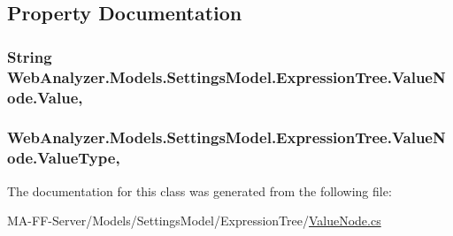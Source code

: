 \subsection{Property Documentation}
\hypertarget{class_web_analyzer_1_1_models_1_1_settings_model_1_1_expression_tree_1_1_value_node_abc4f8ff5dd972ce1c49f135273797926}{}
\subsubsection[{Value}]{\setlength{\rightskip}{0pt plus 5cm}String Web\+Analyzer.\+Models.\+Settings\+Model.\+Expression\+Tree.\+Value\+Node.\+Value\hspace{0.3cm}{\ttfamily [get]}, {\ttfamily [set]}}\label{class_web_analyzer_1_1_models_1_1_settings_model_1_1_expression_tree_1_1_value_node_abc4f8ff5dd972ce1c49f135273797926}
\hypertarget{class_web_analyzer_1_1_models_1_1_settings_model_1_1_expression_tree_1_1_value_node_aa1c55c593ae80ac78221c1397ede5ab2}{}
\subsubsection[{Value\+Type}]{ Web\+Analyzer.\+Models.\+Settings\+Model.\+Expression\+Tree.\+Value\+Node.\+Value\+Type\hspace{0.3cm}{\ttfamily [get]}, {\ttfamily [set]}}\label{class_web_analyzer_1_1_models_1_1_settings_model_1_1_expression_tree_1_1_value_node_aa1c55c593ae80ac78221c1397ede5ab2}


The documentation for this class was generated from the following file\+:\begin{DoxyCompactItemize}
\item 
M\+A-\/\+F\+F-\/\+Server/\+Models/\+Settings\+Model/\+Expression\+Tree/\hyperlink{_value_node_8cs}{Value\+Node.\+cs}\end{DoxyCompactItemize}
